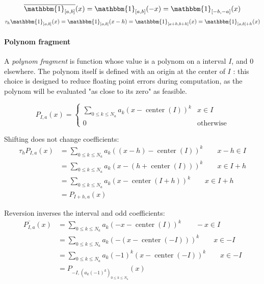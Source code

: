 \documentclass[a4paper,10pt]{article}
\newcommand\Reversed[1]{\overline{#1}}
\newcommand\Indicator[1]{\mathbbm{1}_{#1}}
\DeclareMathOperator{\IntervalCenter}{center}
\begin{document}
\[ \Reversed{\Indicator{[a,b]}}(x) = \Indicator{[a,b]}(-x) = \Indicator{[-b, -a]}(x) \]
\[ \tau_h \Indicator{[a,b]}(x) = \Indicator{[a,b]}(x - h) = \Indicator{[a + h, b + h]}(x) = \Indicator{[a,b] + h}(x) \]

\paragraph{Polynom fragment}

A \emph{polynom fragment} is function whose value is a polynom on a interval $I$, and $0$ elsewhere.
The polynom itself is defined with an origin at the center of $I$ : this choice is designed to reduce floating point errors during computation, as the polynom will be evaluated "as close to its zero" as feasible.
\begin{center}\end{center}
\[
    P_{I,a}(x) = \begin{cases}
        \sum_{0 \le k \le N_a} a_k (x - \IntervalCenter(I))^k & x \in I \\
        0 & \text{otherwise}
    \end{cases}
\]

Shifting does not change coefficients:
\[ \begin{split}
    \tau_h P_{I,a}(x)
    &= \sum_{0 \le k \le N_a} a_k ((x - h) - \IntervalCenter(I))^k \qquad x - h \in I \\
    &= \sum_{0 \le k \le N_a} a_k (x - (h + \IntervalCenter(I)))^k \qquad x \in I + h \\
    &= \sum_{0 \le k \le N_a} a_k (x - \IntervalCenter(I + h))^k \qquad x \in I + h \\
    &= P_{I + h, a}(x)
\end{split} \]

Reversion inverses the interval and odd coefficients:
\[ \begin{split}
    \Reversed{P_{I,a}}(x)
    &= \sum_{0 \le k \le N_a} a_k (-x - \IntervalCenter(I))^k \qquad -x \in I \\
    &= \sum_{0 \le k \le N_a} a_k (-(x - \IntervalCenter(-I)))^k \qquad x \in -I \\
    &= \sum_{0 \le k \le N_a} a_k (-1)^k (x - \IntervalCenter(-I))^k \qquad x \in -I \\
    &= P_{-I, (a_k (-1)^k)_{0 \le k \le N_a}}(x)
\end{split} \]
\end{document}
